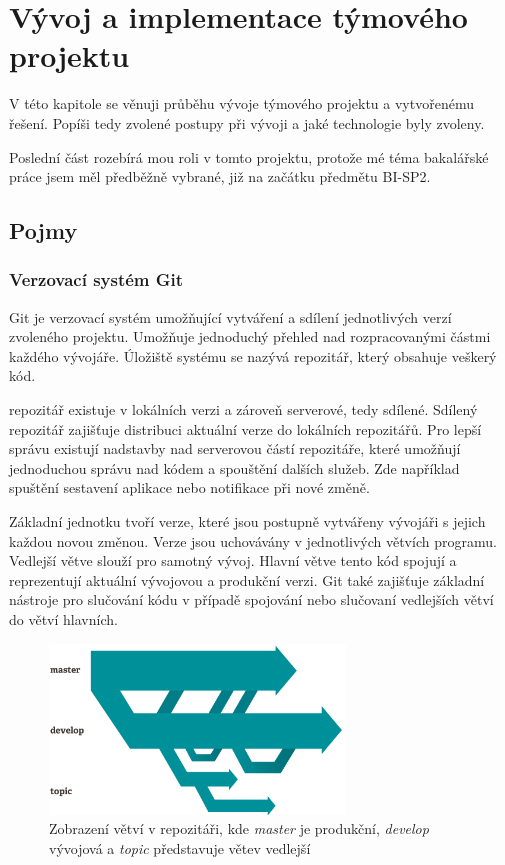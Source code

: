 \documentclass[thesis=B,czech]{FITthesis}[2012/06/26]
\begin{document}
\chapter{Vývoj a implementace týmového projektu}
V této kapitole se věnuji průběhu vývoje týmového projektu a vytvořenému řešení. Popíši tedy zvolené postupy při vývoji a 
jaké technologie byly zvoleny.
\par
Poslední část rozebírá mou roli v tomto
projektu, protože mé téma bakalářské práce jsem měl předběžně vybrané, již na začátku předmětu BI-SP2.


\section{Pojmy}

\subsection{Verzovací systém Git}
Git \cite{GIT} je verzovací systém umožňující vytváření a sdílení jednotlivých verzí zvoleného projektu.
Umožňuje jednoduchý přehled nad rozpracovanými částmi každého vývojáře. Úložiště systému se nazývá repozitář, který obsahuje veškerý kód.
\par
repozitář existuje v lokálních verzi a zároveň serverové, tedy sdílené. Sdílený repozitář zajišťuje distribuci aktuální verze do lokálních 
repozitářů. Pro lepší správu existují nadstavby nad serverovou částí repozitáře, které umožňují jednoduchou
správu nad kódem a spouštění dalších služeb. Zde například spuštění sestavení aplikace nebo notifikace
při nové změně.
\par
Základní jednotku tvoří verze, které jsou postupně vytvářeny vývojáři s jejich každou novou změnou.
Verze jsou uchovávány v jednotlivých větvích programu. Vedlejší větve slouží pro samotný vývoj. 
Hlavní větve tento kód spojují a reprezentují aktuální vývojovou a produkční verzi. Git také zajišťuje základní nástroje pro slučování kódu v případě spojování nebo slučovaní vedlejších větví do větví hlavních.

\begin{figure}[h]\centering
 	\includegraphics[width=0.7\textwidth]{resources/branches}
	\caption[Větve v Git repozitáři]{Zobrazení větví v repozitáři, kde \textit{master} je produkční, \textit{develop} vývojová a \textit{topic}
	představuje větev vedlejší}\label{fig:vetev}
\end{figure}
\end{document}

